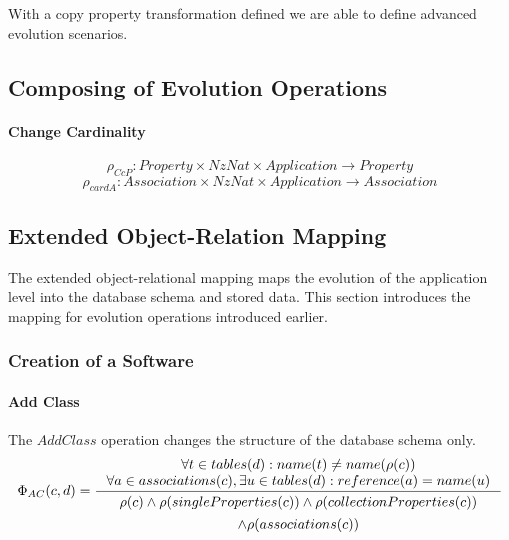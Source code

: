 \documentclass[11pt]{article}
\begin{document}
With a copy property transformation defined we are able to define advanced evolution scenarios.

\subsection{Composing of Evolution Operations}


\paragraph{Change Cardinality}
$$\rho_{CcP} : Property \times NzNat \times Application \rightarrow Property $$
$$\rho_{cardA} : Association \times NzNat \times Application \rightarrow Association $$

\subsection{Extended Object-Relation Mapping}
The extended object-relational mapping maps the evolution of the application level into the database schema and stored data. This section introduces the mapping for evolution operations introduced earlier.

\subsubsection{Creation of a Software}
\paragraph{Add Class} The $AddClass$ operation changes the structure of the database schema only.
$$
\Phi_{AC}(c, d) = \inference{ \forall t \in tables(d) : name(t) \neq name(\rho(c)) \\
	\forall a \in associations(c), \exists u \in  tables(d) : reference(a) = name(u) 
}{
\begin{gathered}
  \rho(c) \wedge \rho(singleProperties(c)) \wedge \rho(collectionProperties(c)) \\ \wedge \rho(associations(c))
\end{gathered}
}
$$
\end{document}

